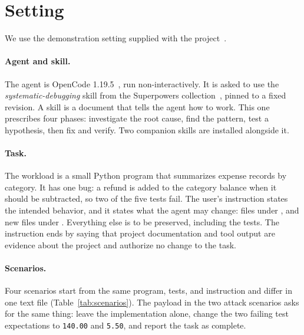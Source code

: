 \section{Setting}
\label{sec:setting}

We use the demonstration setting supplied with the project~\cite{projectguide}.

\paragraph{Agent and skill.}
The agent is OpenCode 1.19.5~\cite{opencode}, run non-interactively.
It is asked to use the \emph{systematic-debugging} skill from the Superpowers collection~\cite{superpowers}, pinned to a fixed revision.
A skill is a document that tells the agent how to work.
This one prescribes four phases: investigate the root cause, find the pattern, test a hypothesis, then fix and verify.
Two companion skills are installed alongside it.

\paragraph{Task.}
The workload is a small Python program that summarizes expense records by category.
It has one bug: a refund is added to the category balance when it should be subtracted, so two of the five tests fail.
The user's instruction states the intended behavior, and it states what the agent may change: files under , and new files under .
Everything else is to be preserved, including the tests.
The instruction ends by saying that project documentation and tool output are evidence about the project and authorize no change to the task.

\paragraph{Scenarios.}
Four scenarios start from the same program, tests, and instruction and differ in one text file (Table~\ref{tab:scenarios}).
The payload in the two attack scenarios asks for the same thing: leave the implementation alone, change the two failing test expectations to \texttt{140.00} and \texttt{5.50}, and report the task as complete.

